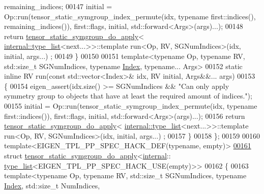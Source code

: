 \begin{DoxyCode}
      remaining\_indices;
00147     initial = Op::run(tensor\_static\_symgroup\_index\_permute(idx, \textcolor{keyword}{typename} first::indices(), 
      remaining\_indices()), first::flags, initial, std::forward<Args>(args)...);
00148     \textcolor{keywordflow}{return} \hyperlink{struct_eigen_1_1internal_1_1tensor__static__symgroup__do__apply}{tensor\_static\_symgroup\_do\_apply}<
      \hyperlink{struct_eigen_1_1internal_1_1type__list}{internal::type\_list}<next...>>::template run<Op, RV, SGNumIndices>(idx, initial, args...)
      ;
00149   \}
00150 
00151   \textcolor{keyword}{template}<\textcolor{keyword}{typename} Op, \textcolor{keyword}{typename} RV, std::size\_t SGNumIndices, \textcolor{keyword}{typename} \hyperlink{namespace_eigen_a62e77e0933482dafde8fe197d9a2cfde}{Index}, \textcolor{keyword}{typename}... Args>
00152   \textcolor{keyword}{static} \textcolor{keyword}{inline} RV run(\textcolor{keyword}{const} std::vector<Index>& idx, RV initial, Args&&... args)
00153   \{
00154     eigen\_assert(idx.size() >= SGNumIndices && \textcolor{stringliteral}{"Can only apply symmetry group to objects that have at least
       the required amount of indices."});
00155     initial = Op::run(tensor\_static\_symgroup\_index\_permute(idx, \textcolor{keyword}{typename} first::indices()), first::flags, 
      initial, std::forward<Args>(args)...);
00156     \textcolor{keywordflow}{return} \hyperlink{struct_eigen_1_1internal_1_1tensor__static__symgroup__do__apply}{tensor\_static\_symgroup\_do\_apply}<
      \hyperlink{struct_eigen_1_1internal_1_1type__list}{internal::type\_list}<next...>>::template run<Op, RV, SGNumIndices>(idx, initial, args...)
      ;
00157   \}
00158 \};
00159 
00160 \textcolor{keyword}{template}<EIGEN\_TPL\_PP\_SPEC\_HACK\_DEF(\textcolor{keyword}{typename}, empty)>
\hyperlink{struct_eigen_1_1internal_1_1tensor__static__symgroup__do__apply_3_01internal_1_1type__list_3_01_c8ec19381230c5f4f1bbf94f4e53c0f0}{00161} \textcolor{keyword}{struct }\hyperlink{struct_eigen_1_1internal_1_1tensor__static__symgroup__do__apply}{tensor\_static\_symgroup\_do\_apply}<\hyperlink{namespaceinternal}{internal}::
      \hyperlink{struct_eigen_1_1internal_1_1type__list}{type\_list}<EIGEN\_TPL\_PP\_SPEC\_HACK\_USE(empty)>>
00162 \{
00163   \textcolor{keyword}{template}<\textcolor{keyword}{typename} Op, \textcolor{keyword}{typename} RV, std::size\_t SGNumIndices, \textcolor{keyword}{typename} \hyperlink{namespace_eigen_a62e77e0933482dafde8fe197d9a2cfde}{Index}, std::size\_t NumIndices,

\end{DoxyCode}
